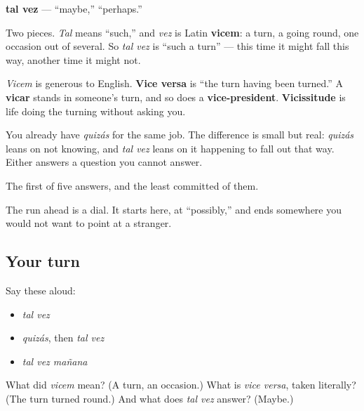\begin{cousinweb}
\textbf{tal vez} — \textquotedblleft{}maybe,\textquotedblright{} \textquotedblleft{}perhaps.\textquotedblright{}

Two pieces. \emph{Tal} means \textquotedblleft{}such,\textquotedblright{} and \emph{vez} is Latin \textbf{vicem}: a turn, a going round, one occasion out of several. So \emph{tal vez} is \textquotedblleft{}such a turn\textquotedblright{} — this time it might fall this way, another time it might not.

\emph{Vicem} is generous to English. \textbf{Vice versa} is \textquotedblleft{}the turn having been turned.\textquotedblright{} A \textbf{vicar} stands in someone's turn, and so does a \textbf{vice-president}. \textbf{Vicissitude} is life doing the turning without asking you.

You already have \emph{quizás} for the same job. The difference is small but real: \emph{quizás} leans on not knowing, and \emph{tal vez} leans on it happening to fall out that way. Either answers a question you cannot answer.
\end{cousinweb}

\begin{grammarlens}[title={What you've built}]
The first of five answers, and the least committed of them.

The run ahead is a dial. It starts here, at \textquotedblleft{}possibly,\textquotedblright{} and ends somewhere you would not want to point at a stranger.
\end{grammarlens}

\subsection*{Your turn}
Say these aloud:

\begin{itemize}
\raggedright
  \item \emph{tal vez}
  \item \emph{quizás}, then \emph{tal vez}
  \item \emph{tal vez mañana}
\end{itemize}

\begin{tcolorbox}[breakable,colback=teal!4,colframe=teal!35!black,title={Before you move on}]
What did \emph{vicem} mean? (A turn, an occasion.) What is \emph{vice versa}, taken literally? (The turn turned round.) And what does \emph{tal vez} answer? (Maybe.)
\end{tcolorbox}
